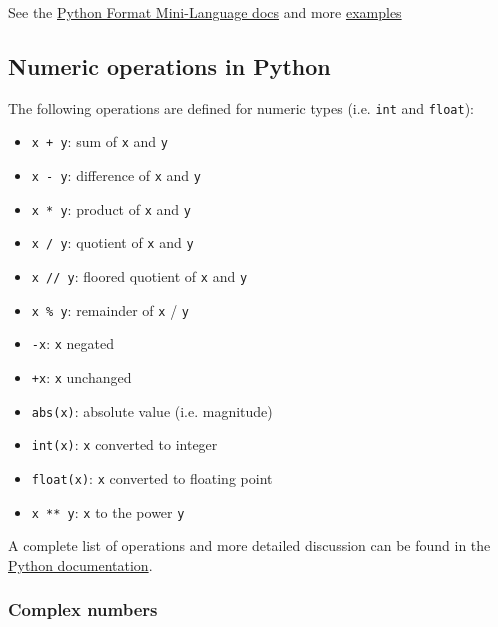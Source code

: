 \documentclass[12pt]{article} \newif\ifsolution\solutiontrue %
\begin{document}
See the \href{https://docs.python.org/3/library/string.html#format-specification-mini-language}{Python Format Mini-Language docs} and more \href{https://docs.python.org/3/library/string.html#format-examples}{examples}


\subsection{Numeric operations in
Python}\label{numeric-operations-in-python}

The following operations are defined for numeric types (i.e.
\texttt{int} and \texttt{float}):

{\begin{multicols}{2}
\begin{itemize}
\item
  \texttt{x\ +\ y}: sum of \texttt{x} and \texttt{y}
\item
  \texttt{x\ -\ y}: difference of \texttt{x} and \texttt{y}
\item
  \texttt{x\ *\ y}: product of \texttt{x} and \texttt{y}
\item
  \texttt{x\ /\ y}: quotient of \texttt{x} and \texttt{y}
\item
  \texttt{x\ //\ y}: floored quotient of \texttt{x} and \texttt{y}
\item
  \texttt{x\ \%\ y}: remainder of \texttt{x} / \texttt{y}
\item
  \texttt{-x}: \texttt{x} negated
\item
  \texttt{+x}: \texttt{x} unchanged
\item
  \texttt{abs(x)}: absolute value (i.e. magnitude)
\item
  \texttt{int(x)}: \texttt{x} converted to integer
\item
  \texttt{float(x)}: \texttt{x} converted to floating point
\item
  \texttt{x\ **\ y}: \texttt{x} to the power \texttt{y}
\end{itemize}
\end{multicols}
}

A complete list of operations and more detailed discussion can be found
in the
\href{https://docs.python.org/3/library/stdtypes.html\#numeric-types-int-float-complex}{Python
documentation}.

\subsubsection{Complex numbers}\label{complex-numbers}
\end{document}
